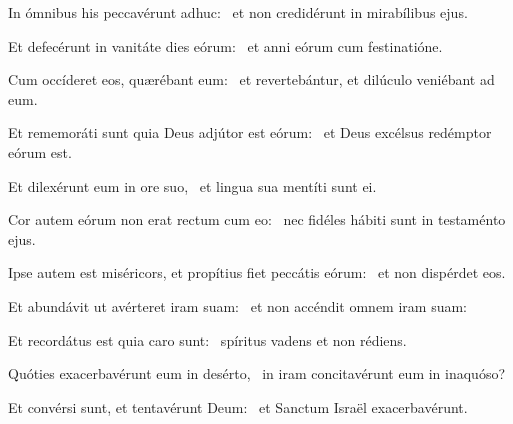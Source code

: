 
\item In ómnibus his peccavérunt adhuc:~\psstar{} et non credidérunt in mirabílibus ejus.

\item Et defecérunt in vanitáte dies eórum:~\psstar{} et anni eórum cum festinatióne.

\item Cum occíderet eos, quærébant eum:~\psstar{} et revertebántur, et dilúculo veniébant ad eum.

\item Et rememoráti sunt quia Deus adjútor est eórum:~\psstar{} et Deus excélsus redémptor eórum est.

\item Et dilexérunt eum in ore suo,~\psstar{} et lingua sua mentíti sunt ei.

\item Cor autem eórum non erat rectum cum eo:~\psstar{} nec fidéles hábiti sunt in testaménto ejus.

\item Ipse autem est miséricors, et propítius fiet peccátis eórum:~\psstar{} et non dispérdet eos.

\item Et abundávit ut avérteret iram suam:~\psstar{} et non accéndit omnem iram suam:

\item Et recordátus est quia caro sunt:~\psstar{} spíritus vadens et non rédiens.

\item Quóties exacerbavérunt eum in desérto,~\psstar{} in iram concitavérunt eum in inaquóso?

\item Et convérsi sunt, et tentavérunt Deum:~\psstar{} et Sanctum Israël exacerbavérunt.
